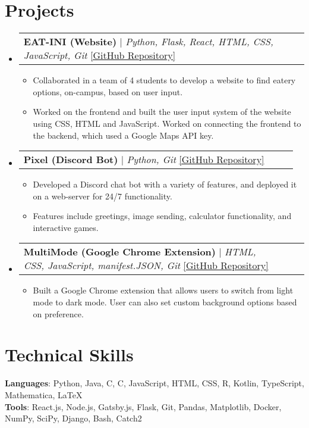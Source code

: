 \documentclass[letterpaper,11pt]{article}
\makeatletter
\newcommand{\resumeItem}[1]{
  \item\small{
    {#1 \vspace{-2pt}}
  }
}
\newcommand{\CC}{C\nolinebreak\hspace{-.05em}\raisebox{.4ex}{\tiny\bf +}\nolinebreak\hspace{-.10em}\raisebox{.4ex}{\tiny\bf +}}
\def\CC{{C\nolinebreak[4]\hspace{-.05em}\raisebox{.4ex}{\tiny\bf ++}}}
\newcommand{\resumeProjectHeading}[2]{
    \item
    \begin{tabular*}{0.97\textwidth}{l@{\extracolsep{\fill}}r}
      \small#1 & #2 \\
    \end{tabular*}\vspace{-7pt}
}
\newcommand{\resumeSubHeadingListStart}{\begin{itemize}[leftmargin=0.15in, label={}]}
\newcommand{\resumeSubHeadingListEnd}{\end{itemize}}
\newcommand{\resumeItemListStart}{\begin{itemize}}
\newcommand{\resumeItemListEnd}{\end{itemize}\vspace{-5pt}}
\makeatother
\begin{document}
\section{Projects}
    \resumeSubHeadingListStart
      \resumeProjectHeading
          {\textbf{EAT-INI (Website)} $|$ \emph{Python, Flask, React, HTML, CSS, JavaScript, Git} \href{https://github.com/CS196Illinois/Group1-SP22}{\color{blue}[GitHub Repository]}}{~~~}
          \resumeItemListStart
            \resumeItem{Collaborated in a team of 4 students to develop a website to find eatery options, on-campus, based on user input.} 
            \resumeItem{Worked on the frontend and built the user input system of the website using CSS, HTML and JavaScript. Worked on connecting the frontend to the backend, which used a Google Maps API key.}
          \resumeItemListEnd
      \resumeProjectHeading
          {\textbf{Pixel (Discord Bot)} $|$ \emph{Python, Git} \href{https://github.com/RamGoenka/pixel}{\color{blue}[GitHub Repository]}}{~~~}
          \resumeItemListStart
            \resumeItem{Developed a Discord chat bot with a variety of features, and deployed it on a web-server for 24/7 functionality.}
            \resumeItem{Features include greetings, image sending, calculator functionality, and interactive games.}
          \resumeItemListEnd
        \resumeProjectHeading
          {\textbf{MultiMode (Google Chrome Extension)} $|$ \emph{HTML, CSS, JavaScript, manifest.JSON, Git} \href{https://github.com/RamGoenka/MutliMode}{\color{blue}[GitHub Repository]}}{~~~}
          \resumeItemListStart
            \resumeItem{Built a Google Chrome extension that allows users to switch from light mode to dark mode. User can also set custom background options based on preference.}
            \resumeItemListEnd
    \resumeSubHeadingListEnd
    
\section{Technical Skills}
 \begin{itemize}[leftmargin=0.10in, label={}]
    \small{\item{
     \textbf{Languages}{: Python, Java, C, \CC, JavaScript, HTML, CSS, R, Kotlin, TypeScript, Mathematica, \LaTeX} \\
     \textbf{Tools}{: React.js, Node.js, Gatsby.js, Flask, Git, Pandas, Matplotlib, Docker, NumPy, SciPy, Django, Bash, Catch2} 
    }}
 \end{itemize}
\end{document}
